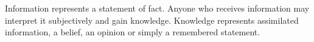 
Information represents a statement of fact.
Anyone who receives information may interpret it subjectively and gain knowledge.
Knowledge represents assimilated information, a belief, an opinion or simply a remembered statement.
